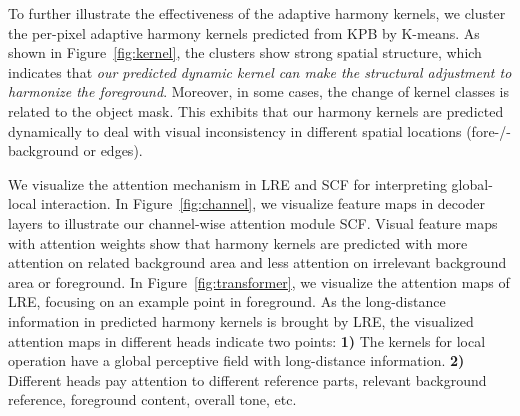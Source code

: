 \documentclass[10pt,twocolumn,letterpaper]{article}
\begin{document}
To further illustrate the effectiveness of the adaptive harmony kernels, we cluster the per-pixel adaptive harmony kernels predicted from KPB by K-means. As shown in Figure~\ref{fig:kernel}, the clusters show strong spatial structure, which indicates that \emph{our predicted dynamic kernel can make the structural adjustment to harmonize the foreground}. Moreover, in some cases, the change of kernel classes is related to the object mask. This exhibits that our harmony kernels are predicted dynamically to deal with visual inconsistency in different spatial locations (\eg fore-/-background or edges).





We visualize the attention mechanism in LRE and SCF for interpreting global-local interaction. In Figure~\ref{fig:channel}, we visualize feature maps in decoder layers to illustrate our channel-wise attention module SCF. Visual feature maps with attention weights show that harmony kernels are predicted with more attention on related background area and less attention on irrelevant background area or foreground. In Figure~\ref{fig:transformer}, we visualize the attention maps of LRE, focusing on an example point in foreground. As the long-distance information in predicted harmony kernels is brought by LRE, the visualized attention maps in different heads indicate two points: {\bf 1)} The kernels for local operation have a global perceptive field with long-distance information. {\bf 2)} Different heads pay attention to different reference parts, \ie relevant background reference, foreground content, overall tone, etc.
\end{document}
